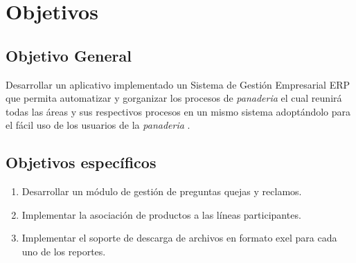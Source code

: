 \chapter{Objetivos}
\section{Objetivo General}
Desarrollar un aplicativo implementado un Sistema de Gesti\'on Empresarial ERP que permita automatizar y gorganizar los procesos de \emph{panaderia} el cual reunir\'a todas las \'areas y sus respectivos procesos en un mismo sistema adopt\'andolo para el f\'acil uso de los usuarios de la \emph{panaderia} .%
\section{Objetivos espec\'ificos}
\begin{enumerate}
\item Desarrollar un m\'odulo de gesti\'on de preguntas quejas y reclamos.
\item Implementar la asociaci\'on de productos a las l\'ineas participantes.
\item Implementar el soporte de descarga de archivos en formato exel para cada uno de los reportes.
\end{enumerate}